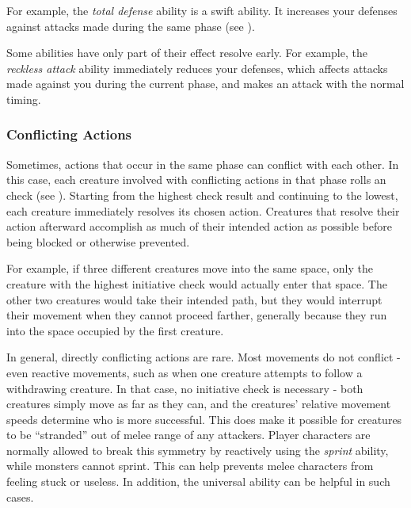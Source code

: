             For example, the \textit{total defense} ability is a swift ability.
            It increases your defenses against attacks made during the same phase (see ).

            Some abilities have only part of their effect resolve early.
            For example, the \textit{reckless attack} ability immediately reduces your defenses, which affects attacks made against you during the current phase, and makes an attack with the normal timing.

        \subsubsection{Conflicting Actions}\label{Conflicting Actions}
            Sometimes, actions that occur in the same phase can conflict with each other.
            In this case, each creature involved with conflicting actions in that phase rolls an  check (see ).
            Starting from the highest check result and continuing to the lowest, each creature immediately resolves its chosen action.
            Creatures that resolve their action afterward accomplish as much of their intended action as possible before being blocked or otherwise prevented.

            For example, if three different creatures move into the same space, only the creature with the highest initiative check would actually enter that space.
            The other two creatures would take their intended path, but they would interrupt their movement when they cannot proceed farther, generally because they run into the space occupied by the first creature.

            In general, directly conflicting actions are rare.
            Most movements do not conflict - even reactive movements, such as when one creature attempts to follow a withdrawing creature.
            In that case, no initiative check is necessary - both creatures simply move as far as they can, and the creatures' relative movement speeds determine who is more successful.
            This does make it possible for creatures to be ``stranded'' out of melee range of any attackers.
            Player characters are normally allowed to break this symmetry by reactively using the \textit{sprint} ability, while monsters cannot sprint.
            This can help prevents melee characters from feeling stuck or useless.
            In addition, the  universal ability can be helpful in such cases.

